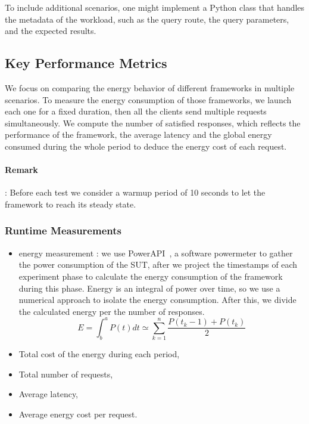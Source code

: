 To include additional scenarios, one might implement a Python class that handles the metadata of the workload, such as the query route, the query parameters, and the expected results.
\subsection{Key Performance Metrics}
We focus on comparing the energy behavior of different frameworks in multiple scenarios.
To measure the energy consumption of those frameworks, we launch each one for a fixed duration, then all the clients send multiple requests simultaneously.
We compute the number of satisfied responses, which reflects the performance of the framework, the average latency and the global energy consumed during the whole period to deduce the energy cost of each request.

\paragraph{Remark}:
Before each test we consider a warmup period of 10 seconds to let the framework to reach its steady state.

\subsubsection{Runtime Measurements}
\begin{itemize}
    \item energy measurement :
          we use PowerAPI~\cite{bourdon:hal-00772454}, a software powermeter to gather the power consumption of the SUT, after we project the timestamps of each experiment phase to calculate the energy consumption of the framework during this phase.
          Energy is an integral of power over time, so we use a numerical approach to isolate the energy consumption.%
          After this, we divide the calculated energy per the number of responses.
              \begin{equation}
                  E = \int^a_b P(t)dt \simeq \sum^n_{k=1} \frac{P(t_k-1)+P(t_k)}{2}
              \end{equation}
    \item Total cost of the energy during each period,
    \item Total number of requests,
    \item Average latency,
    \item Average energy cost per request.
\end{itemize}

